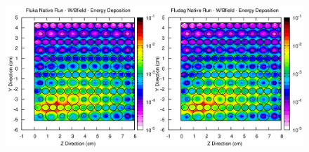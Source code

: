 \begin{figure}[ht!]
 \begin{centering}
 \centering
 \includegraphics[width=0.9\paperwidth,angle=90]{../figs/magnsph_energy_b.png}
 \caption{}
 \label{fig:magnsph_energy_b}
 \end{centering}
\end{figure}


